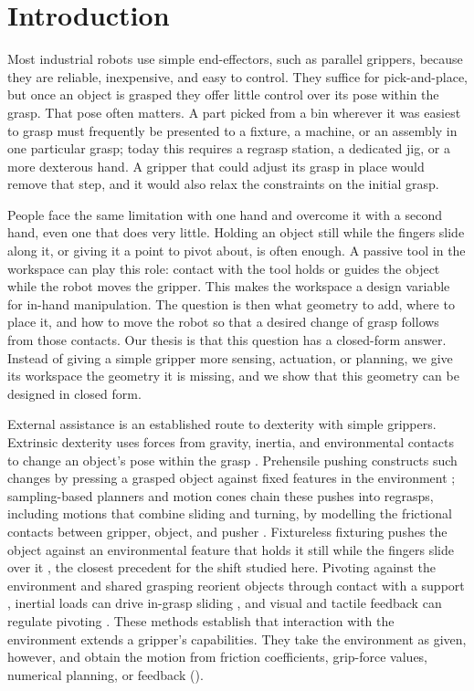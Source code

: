 \section{Introduction}
\label{sec:intro}

Most industrial robots use simple end-effectors, such as parallel grippers, because they are reliable, inexpensive, and easy to control. They suffice for pick-and-place, but once an object is grasped they offer little control over its pose within the grasp. That pose often matters. A part picked from a bin wherever it was easiest to grasp must frequently be presented to a fixture, a machine, or an assembly in one particular grasp; today this requires a regrasp station, a dedicated jig, or a more dexterous hand. A gripper that could adjust its grasp in place would remove that step, and it would also relax the constraints on the initial grasp.

People face the same limitation with one hand and overcome it with a second hand, even one that does very little. Holding an object still while the fingers slide along it, or giving it a point to pivot about, is often enough. A passive tool in the workspace can play this role: contact with the tool holds or guides the object while the robot moves the gripper. This makes the workspace a design variable for in-hand manipulation. The question is then what geometry to add, where to place it, and how to move the robot so that a desired change of grasp follows from those contacts. Our thesis is that this question has a closed-form answer. Instead of giving a simple gripper more sensing, actuation, or planning, we give its workspace the geometry it is missing, and we show that this geometry can be designed in closed form.

External assistance is an established route to dexterity with simple grippers. Extrinsic dexterity uses forces from gravity, inertia, and environmental contacts to change an object's pose within the grasp \cite{dafle2014extrinsic}. Prehensile pushing constructs such changes by pressing a grasped object against fixed features in the environment \cite{chavan2015prehensile,chavan2018stable}; sampling-based planners and motion cones chain these pushes into regrasps, including motions that combine sliding and turning, by modelling the frictional contacts between gripper, object, and pusher \cite{chavan2017sampling,chavan2020planar}. Fixtureless fixturing pushes the object against an environmental feature that holds it still while the fingers slide over it \cite{chavan2018fixtureless}, the closest precedent for the shift studied here. Pivoting against the environment and shared grasping reorient objects through contact with a support \cite{hou2019reorienting,hou2020manipulation}, inertial loads can drive in-grasp sliding \cite{shi2017dynamic}, and visual and tactile feedback can regulate pivoting \cite{karayiannidis2016adaptive,toskov2023hand,kim2024texterity}. These methods establish that interaction with the environment extends a gripper's capabilities. They take the environment as given, however, and obtain the motion from friction coefficients, grip-force values, numerical planning, or feedback ().

